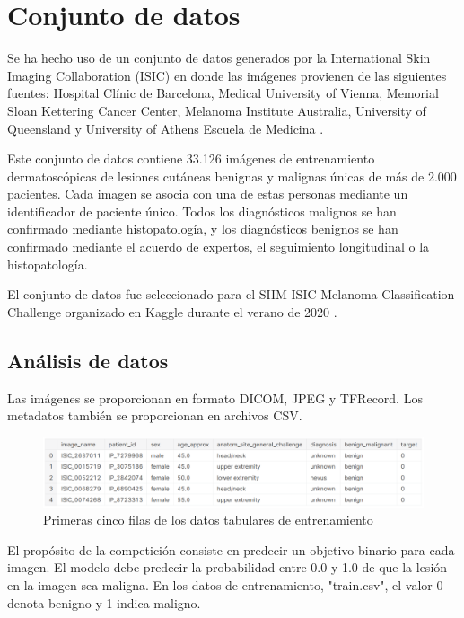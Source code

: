 \chapter{Conjunto de datos} 

Se ha hecho uso de un conjunto de datos generados por la International Skin Imaging Collaboration (ISIC) en donde las imágenes provienen de las siguientes fuentes: Hospital Clínic de Barcelona, Medical University of Vienna, Memorial Sloan Kettering Cancer Center, Melanoma Institute Australia, University of Queensland y University of Athens Escuela de Medicina \citep{isic-archive}.

Este conjunto de datos contiene 33.126 imágenes de entrenamiento dermatoscópicas de lesiones cutáneas benignas y malignas únicas de más de 2.000 pacientes. Cada imagen se asocia con una de estas personas mediante un identificador de paciente único. Todos los diagnósticos malignos se han confirmado mediante histopatología, y los diagnósticos benignos se han confirmado mediante el acuerdo de expertos, el seguimiento longitudinal o la histopatología. 

El conjunto de datos fue seleccionado para el SIIM-ISIC Melanoma Classification Challenge organizado en Kaggle durante el verano de 2020 \cite{kaggle}.


\section{Análisis de datos}

Las imágenes se proporcionan en formato DICOM, JPEG y TFRecord. Los metadatos también se proporcionan en archivos CSV.

\begin{figure}[htbp]
    \centering
    \textbf{}\par\medskip
    \includegraphics[scale=0.5]{3/figures/metadata/datos_tabulares.PNG}
    \caption{Primeras cinco filas de los datos tabulares de entrenamiento}
    \label{tabular_data}
\end{figure}

El propósito de la competición consiste en predecir un objetivo binario para cada imagen. El modelo debe predecir la probabilidad entre 0.0 y 1.0 de que la lesión en la imagen sea maligna. En los datos de entrenamiento, "train.csv", el valor 0 denota benigno y 1 indica maligno.

